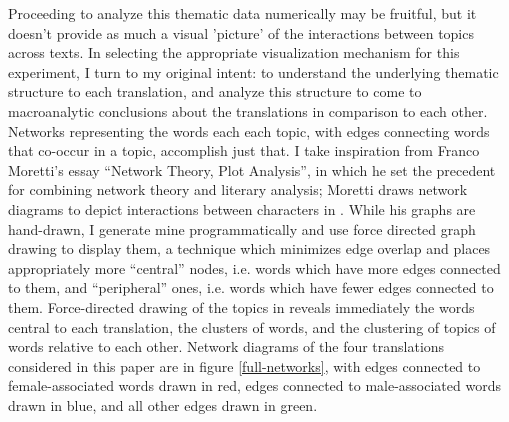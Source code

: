 \documentclass[12pt]{article}
\begin{document}
\begin{flushleft}
\begin{spacing}{2.0}
Proceeding to analyze this thematic data numerically may be fruitful, but it doesn't provide as much a visual 'picture' of the interactions between topics across texts. In selecting the appropriate visualization mechanism for this experiment, I turn to my original intent: to understand the underlying thematic structure to each translation, and analyze this structure to come to macroanalytic conclusions about the translations in comparison to each other. Networks representing the words each each topic, with edges connecting words that co-occur in a topic, accomplish just that. I take inspiration from Franco Moretti's essay ``Network Theory, Plot Analysis'', in which he set the precedent for combining network theory and literary analysis; Moretti draws network diagrams to depict interactions between characters in . While his graphs are hand-drawn, I generate mine programmatically and use force directed graph drawing to display them, a technique which minimizes edge overlap and places appropriately more ``central'' nodes, i.e. words which have more edges connected to them, and ``peripheral'' ones, i.e. words which have fewer edges connected to them. Force-directed drawing of the topics in  reveals immediately the words central to each translation, the clusters of words, and the clustering of topics of words relative to each other. Network diagrams of the four translations considered in this paper are in figure \ref{full-networks}, with edges connected to female-associated words drawn in red, edges connected to male-associated words drawn in blue, and all other edges drawn in green.


\end{spacing}
\end{flushleft}
\end{document}
